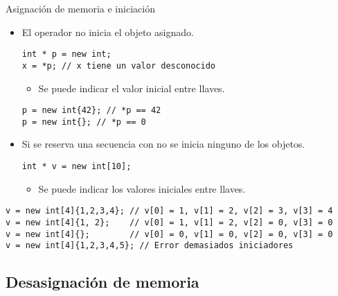 \begin{frame}[fragile]{Asignación de memoria e iniciación}
\vspace{-0.5em}
\begin{itemize}
  \item El operador  no inicia el objeto asignado.
\begin{lstlisting}
int * p = new int;
x = *p; // x tiene un valor desconocido
\end{lstlisting}
    \begin{itemize}
      \item Se puede indicar el valor inicial entre llaves.
    \end{itemize}
\begin{lstlisting}
p = new int{42}; // *p == 42
p = new int{}; // *p == 0
\end{lstlisting}
  \item Si se reserva una secuencia con  no se inicia ninguno de los objetos.
\begin{lstlisting}
int * v = new int[10];
\end{lstlisting}
    \begin{itemize}
      \item Se puede indicar los valores iniciales entre llaves.
    \end{itemize}
\end{itemize}
\begin{lstlisting}
v = new int[4]{1,2,3,4}; // v[0] = 1, v[1] = 2, v[2] = 3, v[3] = 4
v = new int[4]{1, 2};    // v[0] = 1, v[1] = 2, v[2] = 0, v[3] = 0
v = new int[4]{};        // v[0] = 0, v[1] = 0, v[2] = 0, v[3] = 0
v = new int[4]{1,2,3,4,5}; // Error demasiados iniciadores
\end{lstlisting}
\end{frame}

\subsection{Desasignación de memoria}

